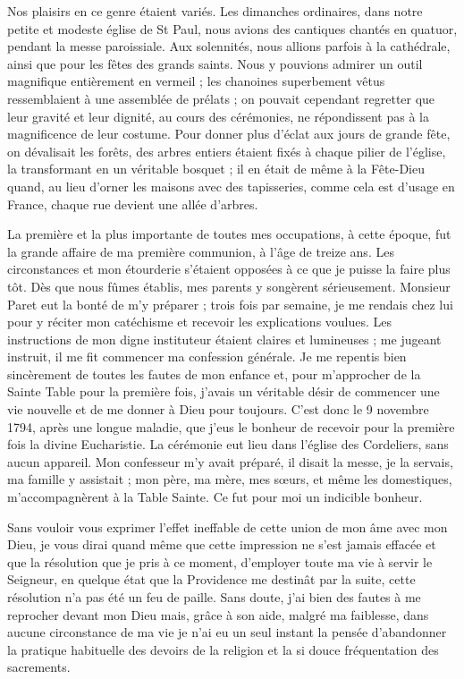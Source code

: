 \documentclass[11pt,a4paper]{report}
\begin{document}
Nos plaisirs en ce genre étaient variés. Les dimanches ordinaires, dans notre petite et modeste église de St Paul, nous avions des cantiques chantés en quatuor, pendant la messe paroissiale. Aux solennités, nous allions parfois à la cathédrale, ainsi que pour les fêtes des grands saints. Nous y pouvions admirer un outil magnifique entièrement en vermeil ; les chanoines superbement vêtus ressemblaient à une assemblée de prélats ; on pouvait cependant regretter que leur gravité et leur dignité, au cours des cérémonies, ne répondissent pas à la magnificence de leur costume. Pour donner plus d'éclat aux jours de grande fête, on dévalisait les forêts, des arbres entiers étaient fixés à chaque pilier de l'église, la transformant en un véritable bosquet ; il en était de même à la Fête-Dieu quand, au lieu d'orner les maisons avec des tapisseries, comme cela est d'usage en France, chaque rue devient une allée d'arbres.

La première et la plus importante de toutes mes occupations, à cette époque, fut la grande affaire de ma première communion, à l'âge de treize ans. Les circonstances et mon étourderie s'étaient opposées à ce que je puisse la faire plus tôt. Dès que nous fûmes établis, mes parents y songèrent sérieusement. Monsieur Paret eut la bonté de m'y préparer ; trois fois par semaine, je me rendais chez lui pour y réciter mon catéchisme et recevoir les explications voulues. Les instructions de mon digne instituteur étaient claires et lumineuses ; me jugeant instruit, il me fit commencer ma confession générale. Je me repentis bien sincèrement de toutes les fautes de mon enfance et, pour m'approcher de la Sainte Table pour la première fois, j'avais un véritable désir de commencer une vie nouvelle et de me donner à Dieu pour toujours. C'est donc le 9 novembre 1794, après une longue maladie, que j'eus le bonheur de recevoir pour la première fois la divine Eucharistie. La cérémonie eut lieu dans l'église des Cordeliers, sans aucun appareil. Mon confesseur m'y avait préparé, il disait la messe, je la servais, ma famille y assistait ; mon père, ma mère, mes sœurs, et même les domestiques, m'accompagnèrent à la Table Sainte. Ce fut pour moi un indicible bonheur.

Sans vouloir vous exprimer l'effet ineffable de cette union de mon âme avec mon Dieu, je vous dirai quand même que cette impression ne s'est jamais effacée et que la résolution que je pris à ce moment, d'employer toute ma vie à servir le Seigneur, en quelque état que la Providence me destinât par la suite, cette résolution n'a pas été un feu de paille. Sans doute, j'ai bien des fautes à me reprocher devant mon Dieu mais, grâce à son aide, malgré ma faiblesse, dans aucune circonstance de ma vie je n'ai eu un seul instant la pensée d'abandonner la pratique habituelle des devoirs de la religion et la si douce fréquentation des sacrements.
\end{document}

